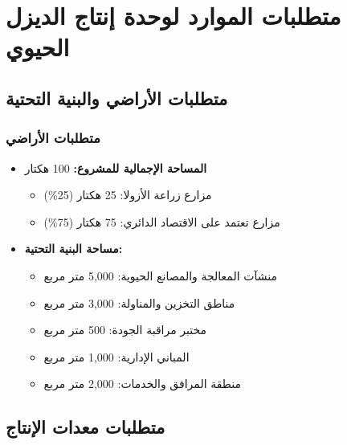 \section{متطلبات الموارد لوحدة إنتاج الديزل الحيوي}

\subsection{متطلبات الأراضي والبنية التحتية}

\subsubsection{متطلبات الأراضي}
\begin{itemize}
    \item \textbf{المساحة الإجمالية للمشروع:} 100 هكتار
    \begin{itemize}
        \item مزارع زراعة الأزولا: 25 هكتار (25\%)
        \item مزارع تعتمد على الاقتصاد الدائري: 75 هكتار (75\%)
    \end{itemize}
    
    \item \textbf{مساحة البنية التحتية:}
    \begin{itemize}
        \item منشآت المعالجة والمصانع الحيوية: 5,000 متر مربع
        \item مناطق التخزين والمناولة: 3,000 متر مربع
        \item مختبر مراقبة الجودة: 500 متر مربع
        \item المباني الإدارية: 1,000 متر مربع
        \item منطقة المرافق والخدمات: 2,000 متر مربع
    \end{itemize}
\end{itemize}

\subsection{متطلبات معدات الإنتاج}

